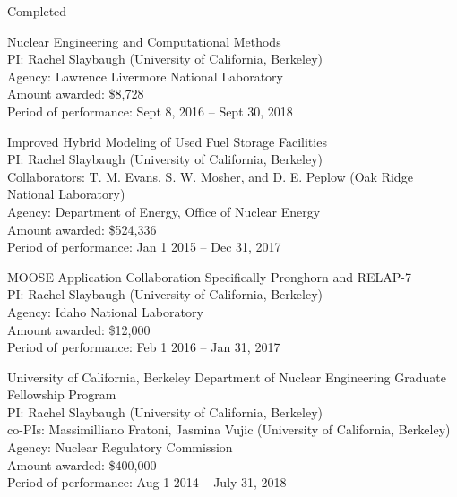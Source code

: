 
\begin{rSubsection}{Completed}{}{}{}
\item Nuclear Engineering and Computational Methods\\
PI: Rachel Slaybaugh (University of California, Berkeley)\\
Agency: Lawrence Livermore National Laboratory \\
Amount awarded: \$8,728\\
Period of performance: Sept 8, 2016 -- Sept 30, 2018	

\vspace*{0.3 em}
\item Improved Hybrid Modeling of Used Fuel Storage Facilities\\
PI: Rachel Slaybaugh (University of California, Berkeley)\\
\hspace*{1 em}  Collaborators: T. M. Evans, S. W. Mosher, and D. E. Peplow (Oak Ridge National Laboratory)\\
Agency: Department of Energy, Office of Nuclear Energy \\
Amount awarded: \$524,336\\
Period of performance: Jan 1 2015 -- Dec 31, 2017

\vspace*{0.3 em}
\item MOOSE Application Collaboration Specifically Pronghorn and RELAP-7\\ 
PI: Rachel Slaybaugh (University of California, Berkeley)\\
Agency: Idaho National Laboratory \\
Amount awarded: \$12,000\\
Period of performance: Feb 1 2016 -- Jan 31, 2017

\vspace*{0.3 em}
\item University of California, Berkeley Department of Nuclear Engineering Graduate Fellowship Program\\ 
PI: Rachel Slaybaugh (University of California, Berkeley)\\
\hspace*{1 em} co-PIs: Massimilliano Fratoni, Jasmina Vujic (University of California, Berkeley)\\
Agency: Nuclear Regulatory Commission \\
Amount awarded: \$400,000\\
Period of performance: Aug 1 2014 -- July 31, 2018



\end{rSubsection}
